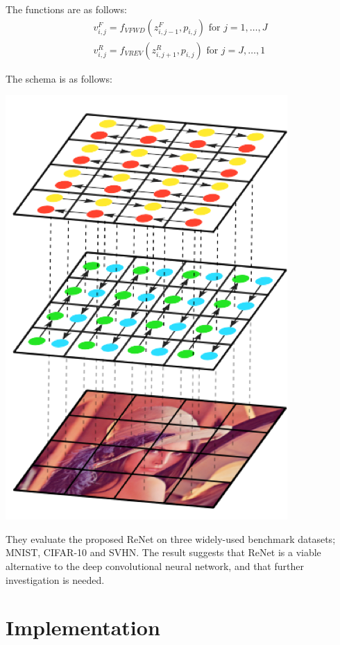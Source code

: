 \documentclass[final,leqno]{siamltex}
\begin{document}
The functions are as follows:
\begin{eqnarray}
	v_{i,j}^F = f_{VFWD}(z_{i,j-1}^F, p_{i,j}) \text{~for } j=1,\dots,J \nonumber \\
	v_{i,j}^R = f_{VREV}(z_{i,j+1}^R, p_{i,j}) \text{~for } j=J,\dots,1 \nonumber
\end{eqnarray}

The schema is as follows:\\
\begin{center}
\includegraphics[scale=0.45]{Figures/onelayer_renet}
\end{center}

They evaluate the proposed ReNet on three widely-used benchmark datasets; MNIST, CIFAR-10 and SVHN. The result suggests that ReNet is a viable alternative to the deep convolutional neural network, and that further investigation is needed.

\section{Implementation} \label{implementation}
\end{document}
